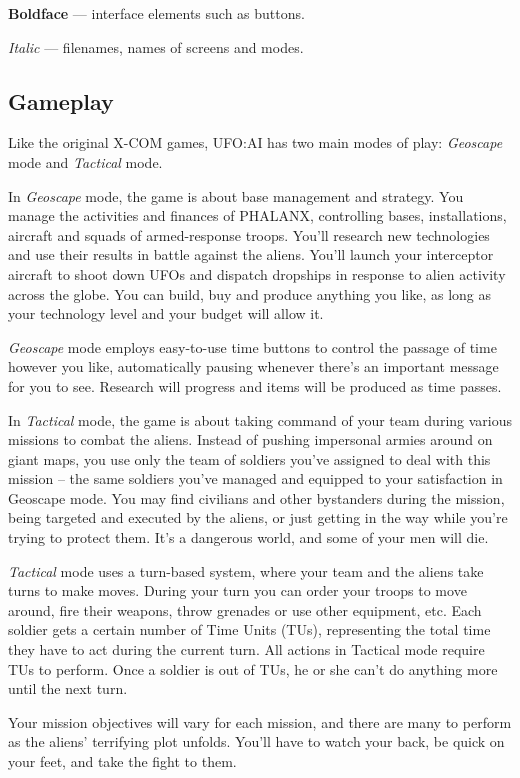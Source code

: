 \textbf{Boldface} --- interface elements such as buttons.

\emph{Italic} --- filenames, names of screens and modes.

\subsection{Gameplay}
Like the original X-COM games, UFO:AI has two main modes of play: \emph{Geoscape} mode and \emph{Tactical} mode.

In \emph{Geoscape} mode, the game is about base management and strategy. You manage the activities and finances of PHALANX, controlling bases, installations, aircraft and squads of armed-response troops. You'll research new technologies and use their results in battle against the aliens. You'll launch your interceptor aircraft to shoot down UFOs and dispatch dropships in response to alien activity across the globe. You can build, buy and produce anything you like, as long as your technology level and your budget will allow it.

\emph{Geoscape} mode employs easy-to-use time buttons to control the passage of time however you like, automatically pausing whenever there's an important message for you to see. Research will progress and items will be produced as time passes.

In \emph{Tactical} mode, the game is about taking command of your team during various missions to combat the aliens. Instead of pushing impersonal armies around on giant maps, you use only the team of soldiers you've assigned to deal with this mission -- the same soldiers you've managed and equipped to your satisfaction in Geoscape mode. You may find civilians and other bystanders during the mission, being targeted and executed by the aliens, or just getting in the way while you're trying to protect them. It's a dangerous world, and some of your men will die.

\emph{Tactical} mode uses a turn-based system, where your team and the aliens take turns to make moves. During your turn you can order your troops to move around, fire their weapons, throw grenades or use other equipment, etc. Each soldier gets a certain number of Time Units (TUs), representing the total time they have to act during the current turn. All actions in Tactical mode require TUs to perform. Once a soldier is out of TUs, he or she can't do anything more until the next turn.

Your mission objectives will vary for each mission, and there are many to perform as the aliens' terrifying plot unfolds. You'll have to watch your back, be quick on your feet, and take the fight to them.

